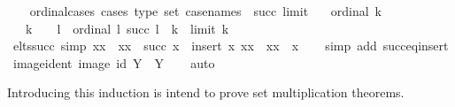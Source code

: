 \begin{isabellebody}
%
\isadelimproof
\ \ %
\endisadelimproof
%
\isatagproof
{}\isamarkupfalse%
%
\endisatagproof
{\isafoldproof}%
%
\isadelimproof
\isanewline
%
\endisadelimproof
\isanewline
{}\isamarkupfalse%
\ ordinal{\isacharunderscore}{\kern0pt}cases\ {\isacharbrackleft}{\kern0pt}cases\ type{\isacharcolon}{\kern0pt}\ set{\isacharcomma}{\kern0pt}\ case{\isacharunderscore}{\kern0pt}names\ {}\ succ\ limit{\isacharbrackright}{\kern0pt}{\isacharcolon}{\kern0pt}\isanewline
\ \ \ {\isachardoublequoteopen}ordinal\ k{\isachardoublequoteclose}\isanewline
\ \ \ {\isachardoublequoteopen}k\ {\isacharequal}{\kern0pt}\ {}{\isachardoublequoteclose}\ {\isacharbar}{\kern0pt}\ l\ \ {\isachardoublequoteopen}ordinal\ l{\isachardoublequoteclose}\ {\isachardoublequoteopen}succ\ l\ {\isacharequal}{\kern0pt}\ k{\isachardoublequoteclose}\ {\isacharbar}{\kern0pt}\ {\isachardoublequoteopen}limit\ k{\isachardoublequoteclose}\isanewline
%
\isadelimproof
\ \ %
\endisadelimproof
%
\isatagproof
{}\isamarkupfalse%
%
\endisatagproof
{\isafoldproof}%
%
\isadelimproof
\isanewline
%
\endisadelimproof
\isanewline
{}\isamarkupfalse%
\ elts{\isacharunderscore}{\kern0pt}succ\ {\isacharbrackleft}{\kern0pt}simp{\isacharbrackright}{\kern0pt}{\isacharcolon}{\kern0pt}\ {\isachardoublequoteopen}{\isacharbraceleft}{\kern0pt}xx\ {\isacharbar}{\kern0pt}\ xx\ {\isasymin}\ {\isacharparenleft}{\kern0pt}succ\ x{\isacharparenright}{\kern0pt}{\isacharbraceright}{\kern0pt}\ {\isacharequal}{\kern0pt}\ insert\ x\ {\isacharbraceleft}{\kern0pt}xx\ {\isacharbar}{\kern0pt}\ xx\ {\isasymin}\ x{\isacharbraceright}{\kern0pt}{\isachardoublequoteclose}\isanewline
%
\isadelimproof
\ \ %
\endisadelimproof
%
\isatagproof
{}\isamarkupfalse%
\ {\isacharparenleft}{\kern0pt}simp\ add{\isacharcolon}{\kern0pt}\ succ{\isacharunderscore}{\kern0pt}eq{\isacharunderscore}{\kern0pt}insert{\isacharparenright}{\kern0pt}%
\endisatagproof
{\isafoldproof}%
%
\isadelimproof
\isanewline
%
\endisadelimproof
\isanewline
{}\isamarkupfalse%
\ image{\isacharunderscore}{\kern0pt}ident{\isacharcolon}{\kern0pt}\ {\isachardoublequoteopen}image\ id\ Y\ {\isacharequal}{\kern0pt}\ Y{\isachardoublequoteclose}\isanewline
%
\isadelimproof
\ \ %
\endisadelimproof
%
\isatagproof
{}\isamarkupfalse%
\ auto%
\endisatagproof
{\isafoldproof}%
%
\isadelimproof
%
\endisadelimproof
%
\begin{isamarkuptext}%
Introducing this induction is intend to prove set multiplication theorems.%

\end{isamarkuptext}
\end{isabellebody}
